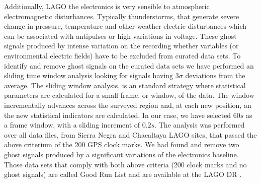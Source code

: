  Additionally, LAGO the electronics is very sensible to atmospheric
electromagnetic disturbances. Typically thunderstorms, that generate severe
change in pressure, temperature  and other weather electric disturbances which
can be associated with antipulses or high variations in voltage. These ghost
signals produced by intense variation on the recording whether variables (or
environmental electric fields) have to be excluded  from curated data sets. To
identify and remove ghost signals on the curated data sets we have performed an
sliding time window analysis looking for signals having 3$\sigma$ deviations
from the average. The sliding window analysis, is an standard strategy where
statistical parameters are calculated for a small frame, or window, of the
data. The window incrementally advances across the surveyed region and, at each
new position, an the new statistical indicators are calculated. In our case, we
have selected $60s$ as a frame window, with a sliding increment of $0.2s$. The
analysis was performed over all data files, from Sierra Negra and Chacaltaya
LAGO sites, that passed the above criterium of the 200 GPS clock marks. We had
found and remove two ghost signals produced by a significant variations of the
electronics baseline. Those data sets that comply with both above criteria (200
clock marks and no ghost signals) are called Good Run List and are available at
the LAGO DR \cite{Sarmiento2012}.
